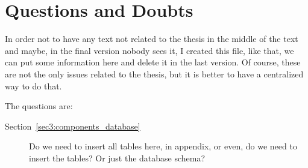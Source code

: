 \chapter*{Questions and Doubts}
    In order not to have any text not related to the thesis in the middle of the text and maybe, in the final version nobody sees it, I created this file, like that, we can put some information here and delete it in the last version. Of course, these are not the only issues related to the thesis, but it is better to have a centralized way to do that.

    The questions are:
\begin{description}
	\item [Section~\ref{sec3:components_database}] Do we need to insert all tables here, in appendix, or even, do we need to insert the tables? Or just the database schema?
\end{description}
